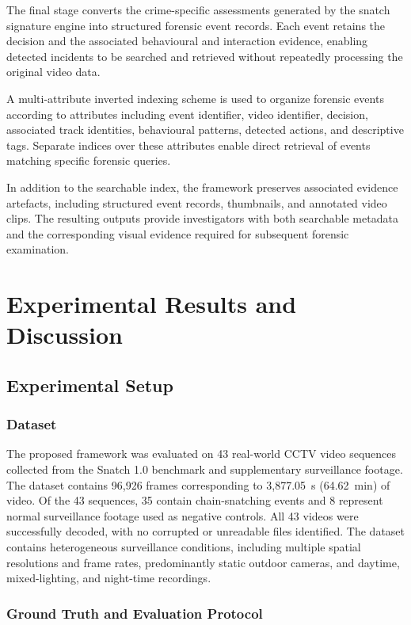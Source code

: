 \documentclass[conference]{IEEEtran}
\begin{document}
The final stage converts the crime-specific assessments generated by the
snatch signature engine into structured forensic event records. Each
event retains the decision and the associated behavioural and interaction
evidence, enabling detected incidents to be searched and retrieved
without repeatedly processing the original video data.

A multi-attribute inverted indexing scheme is used to organize forensic
events according to attributes including event identifier, video
identifier, decision, associated track identities, behavioural patterns,
detected actions, and descriptive tags. Separate indices over these
attributes enable direct retrieval of events matching specific forensic
queries.

In addition to the searchable index, the framework preserves associated
evidence artefacts, including structured event records, thumbnails, and
annotated video clips. The resulting outputs provide investigators with
both searchable metadata and the corresponding visual evidence required
for subsequent forensic examination.

\section{Experimental Results and Discussion}
\subsection{Experimental Setup}

\subsubsection{Dataset}

The proposed framework was evaluated on 43 real-world CCTV video
sequences collected from the Snatch 1.0 benchmark and supplementary
surveillance footage. The dataset contains 96,926 frames corresponding
to 3,877.05~s (64.62~min) of video. Of the 43 sequences, 35 contain
chain-snatching events and 8 represent normal surveillance footage used
as negative controls. All 43 videos were successfully decoded, with no
corrupted or unreadable files identified. The dataset contains
heterogeneous surveillance conditions, including multiple spatial
resolutions and frame rates, predominantly static outdoor cameras, and
daytime, mixed-lighting, and night-time recordings.

\subsubsection{Ground Truth and Evaluation Protocol}
\end{document}
